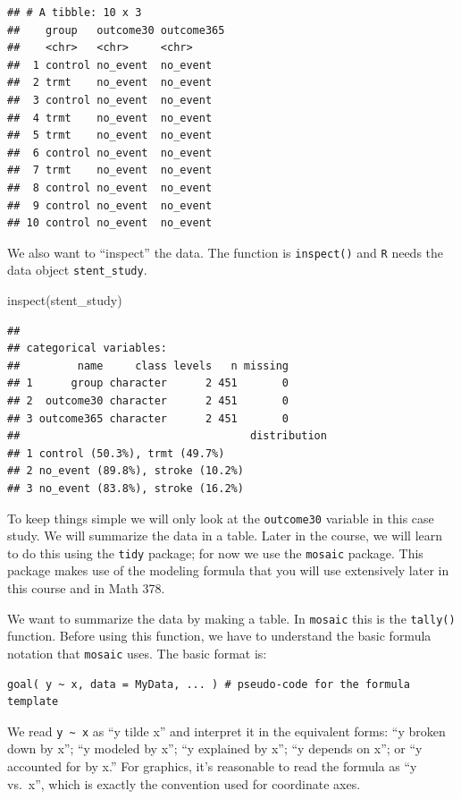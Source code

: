 \documentclass[
]{book}
\newenvironment{Shaded}{\begin{snugshade}}{\end{snugshade}}
\newcommand{\FunctionTok}[1]{\textcolor[rgb]{0.00,0.00,0.00}{#1}}
\newcommand{\NormalTok}[1]{#1}
\begin{document}
\begin{verbatim}
## # A tibble: 10 x 3
##    group   outcome30 outcome365
##    <chr>   <chr>     <chr>     
##  1 control no_event  no_event  
##  2 trmt    no_event  no_event  
##  3 control no_event  no_event  
##  4 trmt    no_event  no_event  
##  5 trmt    no_event  no_event  
##  6 control no_event  no_event  
##  7 trmt    no_event  no_event  
##  8 control no_event  no_event  
##  9 control no_event  no_event  
## 10 control no_event  no_event
\end{verbatim}

We also want to ``inspect'' the data. The function is \texttt{inspect()} and \texttt{R} needs the data object \texttt{stent\_study}.

\begin{Shaded}
\begin{Highlighting}[]
\FunctionTok{inspect}\NormalTok{(stent\_study)}
\end{Highlighting}
\end{Shaded}

\begin{verbatim}
## 
## categorical variables:  
##         name     class levels   n missing
## 1      group character      2 451       0
## 2  outcome30 character      2 451       0
## 3 outcome365 character      2 451       0
##                                    distribution
## 1 control (50.3%), trmt (49.7%)                
## 2 no_event (89.8%), stroke (10.2%)             
## 3 no_event (83.8%), stroke (16.2%)
\end{verbatim}

To keep things simple we will only look at the \texttt{outcome30} variable in this case study. We will summarize the data in a table. Later in the course, we will learn to do this using the \texttt{tidy} package; for now we use the \texttt{mosaic} package. This package makes use of the modeling formula that you will use extensively later in this course and in Math 378.

We want to summarize the data by making a table. In \texttt{mosaic} this is the \texttt{tally()} function. Before using this function, we have to understand the basic formula notation that \texttt{mosaic} uses. The basic format is:

\begin{verbatim}
goal( y ~ x, data = MyData, ... ) # pseudo-code for the formula template
\end{verbatim}

We read \texttt{y\ \textasciitilde{}\ x} as ``y tilde x'' and interpret it in the equivalent forms: ``y broken down by x''; ``y modeled by x''; ``y explained by x''; ``y depends on x''; or ``y accounted for by x.'' For graphics, it's reasonable to read the formula as ``y vs.~x'', which is exactly the convention used for coordinate axes.
\end{document}
